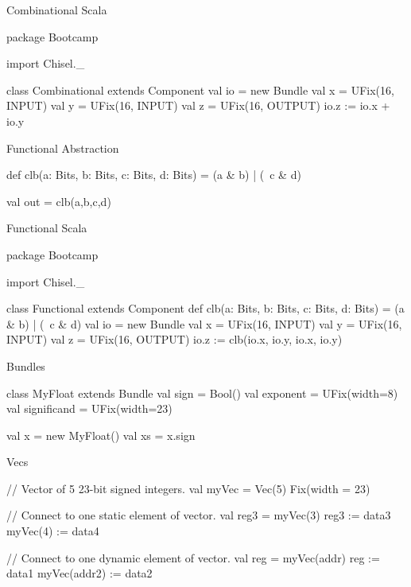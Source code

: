 \documentclass[xcolor=pdflatex,dvipsnames,table]{beamer}
\begin{document}
\begin{frame}[fragile]{Combinational Scala}
\begin{scala}
package Bootcamp {

import Chisel._

class Combinational extends Component {
  val io = new Bundle {
    val x = UFix(16, INPUT)
    val y = UFix(16, INPUT)
    val z = UFix(16, OUTPUT)
  }
  io.z := io.x + io.y
}

}
\end{scala}
\end{frame}

\begin{frame}[fragile]{Functional Abstraction}
\begin{scala}
def clb(a: Bits, b: Bits, c: Bits, d: Bits) = 
  (a & b) | (~c & d)

val out = clb(a,b,c,d)
\end{scala}
\end{frame}

\begin{frame}{Functional Scala}
\begin{scala}
package Bootcamp {

import Chisel._

class Functional extends Component {
  def clb(a: Bits, b: Bits, c: Bits, d: Bits) = 
    (a & b) | (~c & d)
  val io = new Bundle {
    val x = UFix(16, INPUT)
    val y = UFix(16, INPUT)
    val z = UFix(16, OUTPUT)
  }
  io.z := clb(io.x, io.y, io.x, io.y)
}

}
\end{scala}
\end{frame}

\begin{frame}[fragile]{Bundles}
\begin{scala}
class MyFloat extends Bundle{
  val sign        = Bool()
  val exponent    = UFix(width=8)
  val significand = UFix(width=23)
}

val x  = new MyFloat()
val xs = x.sign
\end{scala}
\end{frame}

\begin{frame}[fragile]{Vecs}
\begin{scala}
// Vector of 5 23-bit signed integers.
val myVec = Vec(5) { Fix(width = 23) } 

// Connect to one static element of vector.
val reg3  = myVec(3)                   
reg3     := data3 
myVec(4) := data4

// Connect to one dynamic element of vector.
val reg       = myVec(addr)
reg          := data1
myVec(addr2) := data2
\end{scala}
\end{frame}
\end{document}
